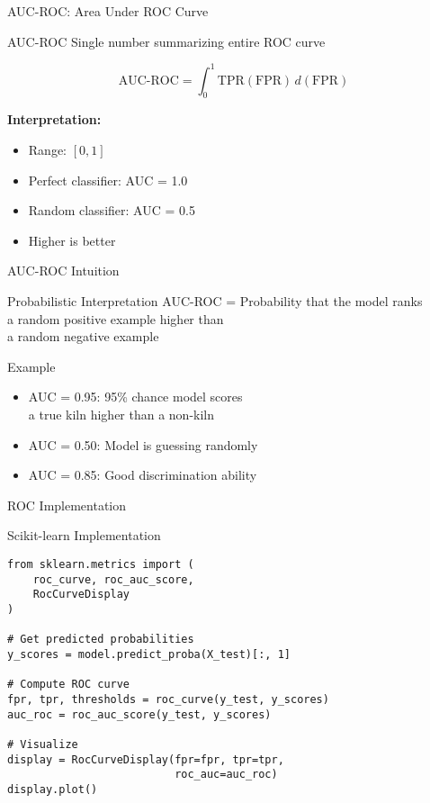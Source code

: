 \documentclass{beamer}
\begin{document}
\begin{frame}{AUC-ROC: Area Under ROC Curve}
\begin{definitionbox}{AUC-ROC}
Single number summarizing entire ROC curve

\vspace{0.2cm}

$$\text{AUC-ROC} = \int_0^1 \text{TPR}(\text{FPR}) \, d(\text{FPR})$$

\vspace{0.2cm}

\textbf{Interpretation:}
\begin{itemize}
    \item Range: $[0, 1]$
    \item Perfect classifier: AUC = 1.0
    \item Random classifier: AUC = 0.5
    \item Higher is better
\end{itemize}
\end{definitionbox}
\end{frame}

\begin{frame}{AUC-ROC Intuition}
\begin{keypointsbox}{Probabilistic Interpretation}
AUC-ROC = Probability that the model ranks \\
a random positive example higher than \\
a random negative example
\end{keypointsbox}

\vspace{0.3cm}

\begin{examplebox}{Example}
\begin{itemize}
    \item AUC = 0.95: 95\% chance model scores \\
          a true kiln higher than a non-kiln
    \item AUC = 0.50: Model is guessing randomly
    \item AUC = 0.85: Good discrimination ability
\end{itemize}
\end{examplebox}
\end{frame}

\begin{frame}[fragile]{ROC Implementation}
\begin{block}{Scikit-learn Implementation}
\small
\begin{verbatim}
from sklearn.metrics import (
    roc_curve, roc_auc_score,
    RocCurveDisplay
)

# Get predicted probabilities
y_scores = model.predict_proba(X_test)[:, 1]

# Compute ROC curve
fpr, tpr, thresholds = roc_curve(y_test, y_scores)
auc_roc = roc_auc_score(y_test, y_scores)

# Visualize
display = RocCurveDisplay(fpr=fpr, tpr=tpr,
                          roc_auc=auc_roc)
display.plot()
\end{verbatim}
\end{block}
\end{frame}
\end{document}
